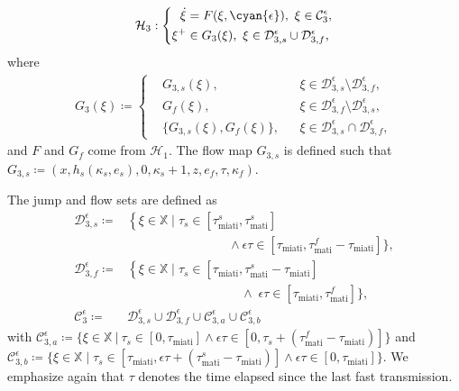 {\begin{equation*}
    \mathcal{H}_3:\left\{
\begin{aligned}
    \dot{\xi} &= F(\xi, \cyan{\epsilon}),\ \xi \in \mathcal{C}_3^\epsilon, \\
    \xi^+ &\in G_3(\xi), \ \xi\in \mathcal{D}_{3,s}^\epsilon \cup \mathcal{D}_{3,f}^\epsilon,
\end{aligned}
    \right.
\end{equation*}
where 
\begin{align*}
    G_3(\xi) \coloneqq \left\{ 
    \begin{aligned}
    &G_{3,s}(\xi), && \xi\in\mathcal{D}_{3,s}^\epsilon \setminus \mathcal{D}_{3,f}^\epsilon , \\
    &G_f(\xi), && \xi\in\mathcal{D}_{3,f}^\epsilon \setminus \mathcal{D}_{3,s}^\epsilon ,\\
    &\{G_{3,s}(\xi),G_f(\xi)\},&& \xi\in \mathcal{D}_{3,s}^\epsilon\cap\mathcal{D}_{3,f}^\epsilon ,
    \end{aligned}
    \right.  
    \end{align*}
and $F$ and $G_f$ come from $\mathcal{H}_1$. The flow map $G_{3,s}$ is defined such that $G_{3,s} \coloneqq (x, h_s(\kappa_s, e_s), 0, \kappa_s +1, z, e_f, \tau, \kappa_f)$.

The jump and flow sets are defined as 
\begin{align*}
    \mathcal{D}_{3,s}^\epsilon \coloneqq & \left\{\xi \in \mathbb{X} \; | \; \tau_s \in [\tau_{\text{miati}}^s, \tau_{\text{mati}}^s] \right. \\
    & \qquad \qquad  \qquad \qquad  \wedge \epsilon \tau \in  [\tau_{\text{miati}}, \tau_{\text{mati}}^f - \tau_{\text{miati}}]  \},
    \\
    \mathcal{D}_{3,f}^\epsilon \coloneqq &\left\{\xi \in \mathbb{X} \; | \; \tau_s \in [\tau_{\text{miati}}, \tau_{\text{mati}}^s-\tau_{\text{miati}}] \right. \\
    & \qquad \qquad \qquad \qquad \quad  \wedge\; \epsilon \tau \in  [\tau_{\text{miati}}, \tau_{\text{mati}}^f]  \},
    \\
    \mathcal{C}_3^\epsilon \coloneqq & 
        \mathcal{D}_{3,s}^\epsilon \cup \mathcal{D}_{3,f}^\epsilon \cup \mathcal{C}_{3,a}^\epsilon \cup \mathcal{C}_{3,b}^\epsilon  
\end{align*}
with $\mathcal{C}_{3,a}^\epsilon \coloneqq \{ \xi \in \mathbb{X} \ | \ \tau_s \in [0, \tau_{\text{miati}}]  \wedge \epsilon \tau \in [0,\tau_s + ( \tau_{\text{mati}}^f - \tau_{\text{miati}})] \} $ and 
$\mathcal{C}_{3,b}^\epsilon \coloneqq \{ \xi \in \mathbb{X} \;|\; \tau_s \in [\tau_{\text{miati}}, \epsilon \tau + (\tau_{\text{mati}}^s - \tau_{\text{miati}})]  \wedge \epsilon \tau \in  [0, \tau_{\text{miati}}]  \}$. 
We emphasize again that $\tau$ denotes the time elapsed since the last fast transmission.


}
